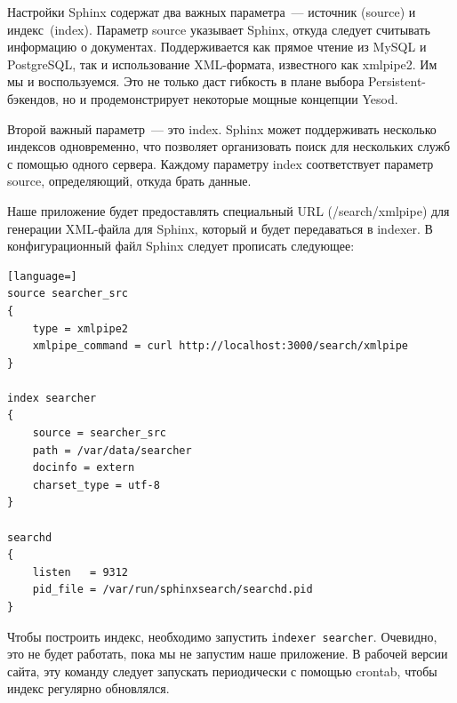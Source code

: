 Настройки Sphinx содержат два важных параметра~--- источник (source) и
индекс~(index). Параметр source указывает Sphinx, откуда следует считывать
информацию о документах. Поддерживается как прямое чтение из MySQL и
PostgreSQL, так и использование XML-формата, известного как xmlpipe2. Им мы и
воспользуемся. Это не только даст гибкость в плане выбора Persistent-бэкендов,
но и продемонстрирует некоторые мощные концепции Yesod.

Второй важный параметр~--- это index. Sphinx может поддерживать несколько
индексов одновременно, что позволяет организовать поиск для нескольких служб с
помощью одного сервера. Каждому параметру index соответствует параметр source,
определяющий, откуда брать данные.

Наше приложение будет предоставлять специальный URL (/search/xmlpipe) для
генерации XML-файла для Sphinx, который и будет передаваться в indexer. В
конфигурационный файл Sphinx следует прописать следующее:
\begin{lstlisting}[language=]
source searcher_src
{
    type = xmlpipe2
    xmlpipe_command = curl http://localhost:3000/search/xmlpipe
}

index searcher
{
    source = searcher_src
    path = /var/data/searcher
    docinfo = extern
    charset_type = utf-8
}

searchd
{
    listen   = 9312
    pid_file = /var/run/sphinxsearch/searchd.pid
}
\end{lstlisting}

Чтобы построить индекс, необходимо запустить \lstinline!indexer searcher!.
Очевидно, это не будет работать, пока мы не запустим наше приложение. В рабочей
версии сайта, эту команду следует запускать периодически с помощью crontab,
чтобы индекс регулярно обновлялся.


